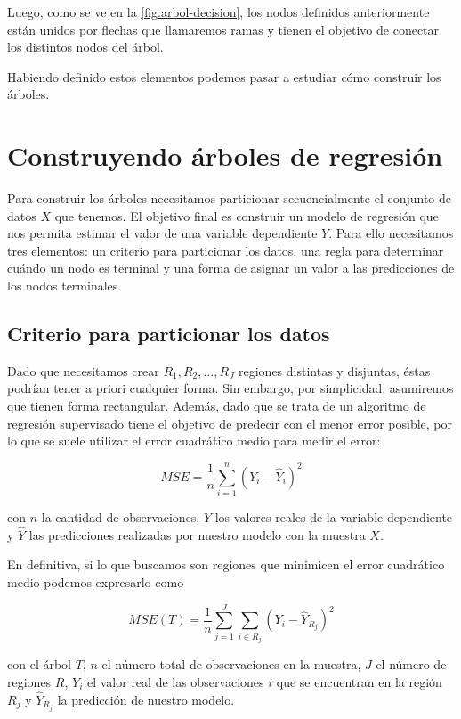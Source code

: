 Luego, como se ve en la \autoref{fig:arbol-decision}, los nodos definidos anteriormente están unidos por flechas que llamaremos ramas y tienen el objetivo de conectar los distintos nodos del árbol.

Habiendo definido estos elementos podemos pasar a estudiar cómo construir los árboles.

\section{Construyendo árboles de regresión}
Para construir los árboles necesitamos particionar secuencialmente el conjunto de datos $X$ que tenemos. El objetivo final es construir un modelo de regresión que nos permita estimar el valor de una variable dependiente $Y$. Para ello necesitamos tres elementos: un criterio para particionar los datos, una regla para determinar cuándo un nodo es terminal y una forma de asignar un valor a las predicciones de los nodos terminales.

\subsection{Criterio para particionar los datos}
Dado que necesitamos crear $R_1,R_2,...,R_J$ regiones distintas y disjuntas, éstas podrían tener a priori cualquier forma. Sin embargo, por simplicidad, asumiremos que tienen forma rectangular. Además, dado que se trata de un algoritmo de regresión supervisado tiene el objetivo de predecir con el menor error posible, por lo que se suele utilizar el error cuadrático medio para medir el error:

\begin{equation}
    MSE=\frac{1}{n}\sum_{i=1}^{n}(Y_i-\hat{Y}_i)^2
\end{equation}

con $n$ la cantidad de observaciones, $Y$ los valores reales de la variable dependiente y $\hat{Y}$ las predicciones realizadas por nuestro modelo con la muestra $X$.

En definitiva, si lo que buscamos son regiones que minimicen el error cuadrático medio podemos expresarlo como

\begin{equation}
MSE(T)=\frac{1}{n}\sum_{j=1}^{J}\sum_{i \in R_j}(Y_i-\hat{Y}_{R_j})^2    
\end{equation}

con el árbol $T$, $n$ el número total de observaciones en la muestra, $J$ el número de regiones $R$, $Y_i$ el valor real de las observaciones $i$ que se encuentran en la región $R_j$ y $\hat{Y}_{R_j}$ la predicción de nuestro modelo. 

